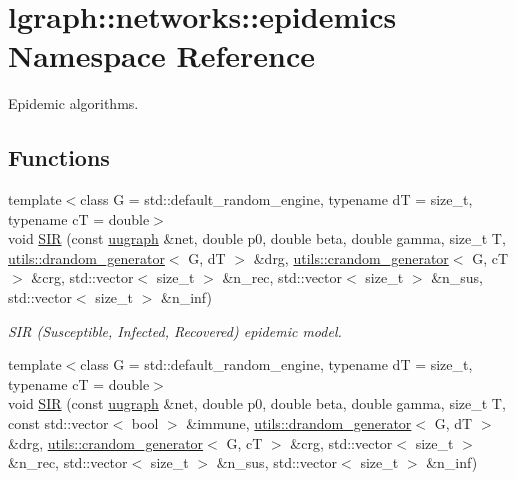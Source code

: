 \hypertarget{namespacelgraph_1_1networks_1_1epidemics}{}\section{lgraph\+:\+:networks\+:\+:epidemics Namespace Reference}
\label{namespacelgraph_1_1networks_1_1epidemics}


Epidemic algorithms.  


\subsection*{Functions}
\begin{DoxyCompactItemize}
\item 
{\footnotesize template$<$class G  = std\+::default\+\_\+random\+\_\+engine, typename dT  = size\+\_\+t, typename cT  = double$>$ }\\void \hyperlink{namespacelgraph_1_1networks_1_1epidemics_ab3c20f0604bb3c45e501755d10e7c7b1}{S\+IR} (const \hyperlink{classlgraph_1_1uugraph}{uugraph} \&net, double p0, double beta, double gamma, size\+\_\+t T, \hyperlink{classlgraph_1_1utils_1_1drandom__generator}{utils\+::drandom\+\_\+generator}$<$ G, dT $>$ \&drg, \hyperlink{classlgraph_1_1utils_1_1crandom__generator}{utils\+::crandom\+\_\+generator}$<$ G, cT $>$ \&crg, std\+::vector$<$ size\+\_\+t $>$ \&n\+\_\+rec, std\+::vector$<$ size\+\_\+t $>$ \&n\+\_\+sus, std\+::vector$<$ size\+\_\+t $>$ \&n\+\_\+inf)
\begin{DoxyCompactList}\small\item\em S\+IR (Susceptible, Infected, Recovered) epidemic model. \end{DoxyCompactList}\item 
{\footnotesize template$<$class G  = std\+::default\+\_\+random\+\_\+engine, typename dT  = size\+\_\+t, typename cT  = double$>$ }\\void \hyperlink{namespacelgraph_1_1networks_1_1epidemics_af7c21ddb81d8637daacc904cd2eca4e8}{S\+IR} (const \hyperlink{classlgraph_1_1uugraph}{uugraph} \&net, double p0, double beta, double gamma, size\+\_\+t T, const std\+::vector$<$ bool $>$ \&immune, \hyperlink{classlgraph_1_1utils_1_1drandom__generator}{utils\+::drandom\+\_\+generator}$<$ G, dT $>$ \&drg, \hyperlink{classlgraph_1_1utils_1_1crandom__generator}{utils\+::crandom\+\_\+generator}$<$ G, cT $>$ \&crg, std\+::vector$<$ size\+\_\+t $>$ \&n\+\_\+rec, std\+::vector$<$ size\+\_\+t $>$ \&n\+\_\+sus, std\+::vector$<$ size\+\_\+t $>$ \&n\+\_\+inf)

\end{DoxyCompactItemize}
